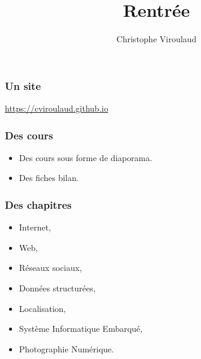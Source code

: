 \documentclass[svgnames,11pt]{beamer}
\author[]{Christophe Viroulaud}
\title{Rentrée}
\date{}
\institute{Seconde - SNT}
\begin{document}
\begin{frame}
\titlepage
\end{frame}
\begin{frame}
    \frametitle{Un site}

\begin{center}
    {\LARGE \url{https://cviroulaud.github.io}}
\end{center}
\end{frame}
\begin{frame}
    \frametitle{Des cours}

    
    \begin{itemize}
        \item Des cours sous forme de diaporama.
        \item Des fiches bilan.
    \end{itemize}

\end{frame}
\begin{frame}
    \frametitle{Des chapitres}

    \begin{itemize}
        \item Internet,
        \item Web,
        \item Réseaux sociaux,
        \item Données structurées,
        \item Localisation,
        \item Système Informatique Embarqué,
        \item Photographie Numérique.
    \end{itemize}

\end{frame}
\end{document}
